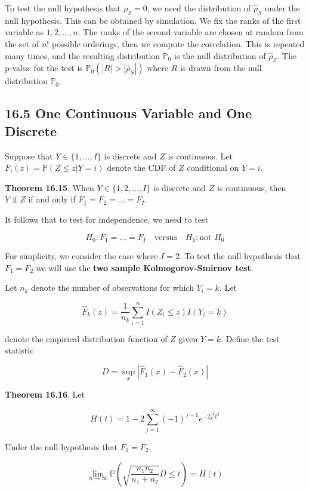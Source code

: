 {To test the null hypothesis that \(\rho_S = 0\), we need the
distribution of \(\hat{\rho}_S\) under the null hypothesis. This can be
obtained by simulation. We fix the ranks of the first variable as
\(1, 2, \dots, n\). The ranks of the second variable are chosen at
random from the set of \(n!\) possible orderings, then we compute the
correlation. This is repeated many times, and the resulting distribution
\(\mathbb{P}_0\) is the null distribution of \(\hat{\rho}_S\). The
p-value for the test is \(\mathbb{P}_0(|R| > |\hat{\rho}_S|)\) where
\(R\) is drawn from the null distribution \(\mathbb{P}_0\).

\subsection{16.5 One Continuous Variable and One
Discrete}\label{one-continuous-variable-and-one-discrete}

Suppose that \(Y \in \{ 1, \dots, I \}\) is discrete and \(Z\) is
continuous. Let \(F_i(z) = \mathbb{P}(Z \leq z | Y = i)\) denote the CDF
of \(Z\) conditional on \(Y = i\).

\textbf{Theorem 16.15}. When \(Y \in \{ 1, 2, \dots, I \}\) is discrete
and \(Z\) is continuous, then \(Y \text{ ⫫ } Z\) if and only if
\(F_1 = F_2 = \dots = F_I\).

It follows that to test for independence, we need to test

\[ 
H_0: F_1 = \dots = F_I
\quad \text{versus} \quad
H_1: \text{not } H_0
\]

For simplicity, we consider the case where \(I = 2\). To test the null
hypothesis that \(F_1 = F_2\) we will use the \textbf{two sample
Kolmogorov-Smirnov test}.

Let \(n_k\) denote the number of observations for which \(Y_i = k\). Let

\[\hat{F}_k(z) = \frac{1}{n_k} \sum_{i=1}^n I(Z_i \leq z) I(Y_i = k)\]

denote the empirical distribution function of \(Z\) given \(Y = k\).
Define the test statistic

\[ D = \sup_x | \hat{F}_1(x) - \hat{F}_2(x) |\]

\textbf{Theorem 16.16}. Let

\[ H(t) = 1 - 2 \sum_{j=1}^\infty (-1)^{j-1} e^{-2j^2t^2} \]

Under the null hypothesis that \(F_1 = F_2\),

\[ \lim_{n \rightarrow \infty} \mathbb{P} \left( \sqrt{\frac{n_1 n_2}{n_1 + n_2}} D \leq t \right) = H(t) \]

}
